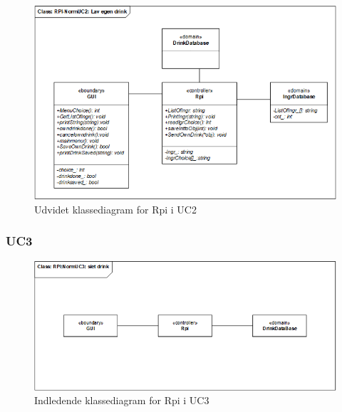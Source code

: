 \begin{figure}[H]
    \centering
    \includegraphics[width=1\textwidth]{Images/Applikationsmodeller/rpi/rpi_UdvidetklassediagramNormUC2.png}
    \caption{Udvidet klassediagram for Rpi i UC2}
    \label{fig:UcdUC2Rpi}
\end{figure}

\subsubsection{UC3}

\begin{figure}[H]
    \centering
    \includegraphics[width=1\textwidth]{Images/Applikationsmodeller/rpi/rpi_klassediagramNormUC3.png}
    \caption{Indledende klassediagram for Rpi i UC3}
    \label{fig:cdUC3Rpi}
\end{figure}

